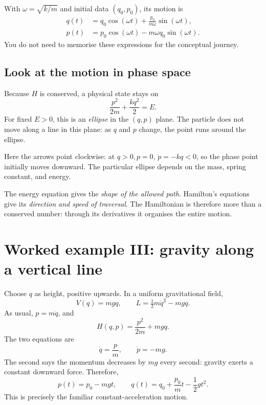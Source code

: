 \documentclass[11pt,a4paper,oneside]{article}
\begin{document}
With $\omega=\sqrt{k/m}$ and initial data $(q_0,p_0)$, its motion is
\begin{align*}
 q(t)&=q_0\cos(\omega t)+\frac{p_0}{m\omega}\sin(\omega t),\\
 p(t)&=p_0\cos(\omega t)-m\omega q_0\sin(\omega t).
\end{align*}
You do not need to memorise these expressions for the conceptual journey.

\subsection{Look at the motion in phase space}
Because $H$ is conserved, a physical state stays on
\[
 \frac{p^2}{2m}+\frac{kq^2}{2}=E.
\]
For fixed $E>0$, this is an \emph{ellipse} in the $(q,p)$ plane. The particle does not move along a line in this plane: as $q$ and $p$ change, the point runs around the ellipse.

\begin{center}
\end{center}
Here the arrows point clockwise: at $q>0,p=0$, $\dot p=-kq<0$, so the phase point initially moves downward. The particular ellipse depends on the mass, spring constant, and energy.

\begin{intuition}
The energy equation gives the \emph{shape of the allowed path}. Hamilton's equations give its \emph{direction and speed of traversal}. The Hamiltonian is therefore more than a conserved number: through its derivatives it organises the entire motion.
\end{intuition}

\section{Worked example III: gravity along a vertical line}
Choose $q$ as height, positive upwards. In a uniform gravitational field,
\[
 V(q)=mgq,\qquad L=\tfrac12m\dot q^2-mgq.
\]
As usual, $p=m\dot q$, and
\[
 H(q,p)=\frac{p^2}{2m}+mgq.
\]
The two equations are
\[
 \dot q=\frac{p}{m},\qquad\dot p=-mg.
\]
The second says the momentum decreases by $mg$ every second: gravity exerts a constant downward force. Therefore,
\[
 p(t)=p_0-mgt,
\qquad
 q(t)=q_0+\frac{p_0}{m}t-\frac12gt^2.
\]
This is precisely the familiar constant-acceleration motion.
\end{document}
